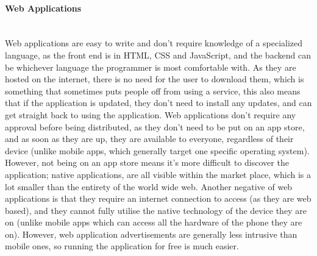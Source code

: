 \documentclass[a4paper,twoside,notitlepage,11pt]{article}
\begin{document}
\paragraph{Web Applications}\ \\
Web applications are easy to write and don't require knowledge of a specialized language, as the front end is in HTML, CSS and JavaScript, and the backend can be whichever language the programmer is most comfortable with. As they are hosted on the internet, there is no need for the user to download them, which is something that sometimes puts people off from using a service, this also means that if the application is updated, they don't need to install any updates, and can get straight back to using the application. Web applications don't require any approval before being distributed, as they don't need to be put on an app store, and as soon as they are up, they are available to everyone, regardless of their device (unlike mobile apps, which generally target one specific operating system). However, not being on an app store means it's more difficult to discover the application; native applications, are all visible within the market place, which is a lot smaller than the entirety of the world wide web. Another negative of web applications is that they require an internet connection to access (as they are web based), and they cannot fully utilise the native technology of the device they are on (unlike mobile apps which can access all the hardware of the phone they are on). However, web application advertisements are generally less intrusive than mobile ones, so running the application for free is much easier.
\end{document}

